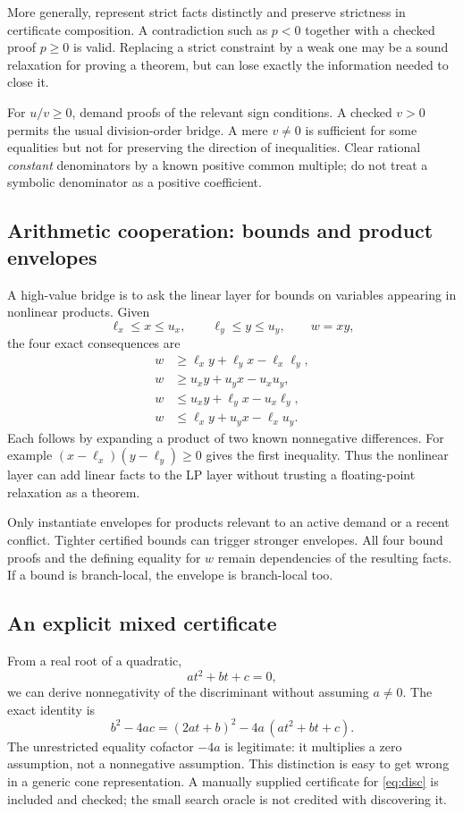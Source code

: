 \documentclass[11pt,letterpaper]{article}
\theoremstyle{definition}\newtheorem{definition}[proposition]{Definition}
\begin{document}
More generally, represent strict facts distinctly and preserve strictness in certificate composition. A contradiction such as $p<0$ together with a checked proof $p\ge0$ is valid. Replacing a strict constraint by a weak one may be a sound relaxation for proving a theorem, but can lose exactly the information needed to close it.

For $u/v\ge0$, demand proofs of the relevant sign conditions. A checked $v>0$ permits the usual division-order bridge. A mere $v\ne0$ is sufficient for some equalities but not for preserving the direction of inequalities. Clear rational \emph{constant} denominators by a known positive common multiple; do not treat a symbolic denominator as a positive coefficient.

\subsection{Arithmetic cooperation: bounds and product envelopes}
A high-value bridge is to ask the linear layer for bounds on variables appearing in nonlinear products. Given
\[
\ell_x\le x\le u_x,\qquad \ell_y\le y\le u_y,\qquad w=xy,
\]
the four exact consequences are
\begin{align*}
w&\ge \ell_x y+\ell_y x-\ell_x\ell_y,\\
w&\ge u_x y+u_y x-u_xu_y,\\
w&\le u_x y+\ell_y x-u_x\ell_y,\\
w&\le \ell_x y+u_y x-\ell_xu_y.
\end{align*}
Each follows by expanding a product of two known nonnegative differences. For example $(x-\ell_x)(y-\ell_y)\ge0$ gives the first inequality. Thus the nonlinear layer can add linear facts to the LP layer without trusting a floating-point relaxation as a theorem.

Only instantiate envelopes for products relevant to an active demand or a recent conflict. Tighter certified bounds can trigger stronger envelopes. All four bound proofs and the defining equality for $w$ remain dependencies of the resulting facts. If a bound is branch-local, the envelope is branch-local too.

\subsection{An explicit mixed certificate}
From a real root of a quadratic,
\[
a t^2+bt+c=0,
\]
we can derive nonnegativity of the discriminant without assuming $a\ne0$. The exact identity is
\begin{equation}
\label{eq:disc}
b^2-4ac=(2at+b)^2-4a\,(at^2+bt+c).
\end{equation}
The unrestricted equality cofactor $-4a$ is legitimate: it multiplies a zero assumption, not a nonnegative assumption. This distinction is easy to get wrong in a generic cone representation. A manually supplied certificate for \eqref{eq:disc} is included and checked; the small search oracle is not credited with discovering it.
\end{document}
